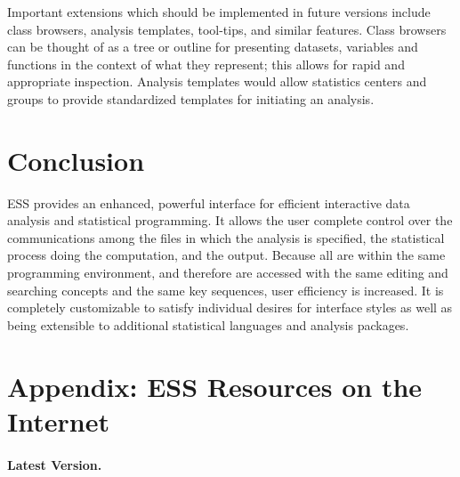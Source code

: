 \documentclass{article}
\newcommand*{\SAS}{\textsc{SAS}}
\begin{document}

Important extensions which should be implemented in future
versions include class browsers, analysis templates, tool-tips, and
similar features.  Class browsers can be thought of as a tree or
outline for presenting datasets, variables and functions in the
context of what they represent; this allows for rapid and appropriate
inspection.  Analysis templates would allow statistics centers and
groups to provide standardized templates for initiating an analysis.


\section{Conclusion}

ESS provides 
an enhanced, powerful interface for efficient interactive data
analysis and statistical programming.  
It allows the user complete control over the communications among the
files in which the analysis is specified, the statistical process doing
the computation, and the output.  Because all are within the same programming
environment, and therefore are accessed with the same
editing and searching concepts and the same key sequences,
user efficiency is increased.
It is completely customizable
to satisfy individual desires for interface styles as well as being
extensible to additional statistical languages and analysis packages.






\clearpage

\appendix 
\section{Appendix: ESS Resources on the Internet}
\label{sec:access}

\paragraph{Latest Version.}
\end{document}
